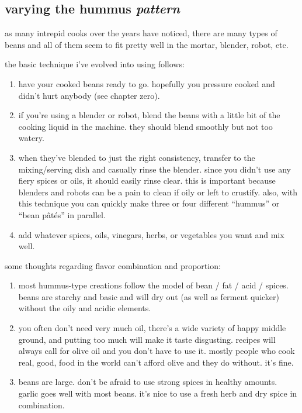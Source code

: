 \subsection{varying the hummus \textit{pattern}}

as many intrepid cooks over the years have noticed, there are many
types of beans and all of them seem to fit pretty well in the mortar,
blender, robot, etc.

the basic technique i've evolved into using follows:

\begin{enumerate}
  \item have your cooked beans ready to go. hopefully you pressure
  cooked and didn't hurt anybody (see chapter zero).

  \item if you're using a blender or robot, blend the beans with a
  little bit of the cooking liquid in the machine. they should blend
  smoothly but not too watery.

  \item when they've blended to just the right consistency,
  transfer to the mixing/serving dish and casually rinse the
  blender. since you didn't use any fiery spices or oils, it should
  easily rinse clear. this is important because blenders and robots
  can be a pain to clean if oily or left to crustify. also, with this
  technique you can quickly make three or four different
  ``hummus'' or ``bean p\^{a}t\'{e}s'' in parallel.

  \item add whatever spices, oils, vinegars, herbs, or vegetables you
  want and mix well.
\end{enumerate}

some thoughts regarding flavor combination and proportion:

\begin{enumerate}
  \item most hummus-type creations follow the model of bean / fat /
  acid / spices. beans are starchy and basic and will dry out (as well
  as ferment quicker) without the oily and acidic elements.

  \item you often don't need very much oil, there's a wide
  variety of happy middle ground, and putting too much will make it
  taste disgusting. recipes will always call for olive oil and you
  don't have to use it. mostly people who cook real, good, food in
  the world can't afford olive and they do without. it's fine.

  \item beans are large. don't be afraid to use strong spices in
  healthy amounts. garlic goes well with most beans. it's nice to
  use a fresh herb and dry spice in combination.
\end{enumerate}

